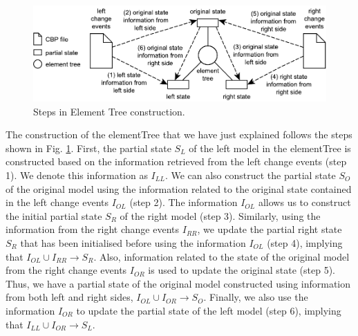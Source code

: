 \begin{figure}
    \centering
    \includegraphics[width=0.7\linewidth]{TreeConstruction}
    \caption{Steps in Element Tree construction.}
    \label{fig:tree_construction}
\end{figure} 

The construction of the \textsf{elementTree} that we have just explained follows the steps shown in Fig. \ref{fig:tree_construction}. First, the partial
state $S_{L}$ of the left model in the \textsf{elementTree} is constructed based on the information retrieved from the left change events (step 1). We denote this information as $I_{LL}$. We can also construct the partial 
state $S_{O}$ of the original model using the information related to the original state contained in the left change events $I_{OL}$ (step 2). The information $I_{OL}$ allows us to construct the initial partial 
state $S_{R}$ of the right model 
(step 3). Similarly, using the information from the right change events $I_{RR}$, we update the partial right state $S_{R}$ that has been initialised before using the information $I_{OL}$ (step 4), implying that $I_{OL} \cup I_{RR} \rightarrow S_{R}$. Also, information related to the state of the original model from the right change events $I_{OR}$ is used to update the original state  (step 5). Thus, we have a partial state of the original model constructed using information from both left and right sides, $I_{OL} \cup I_{OR} \rightarrow S_{O}$. Finally, we also use the information $I_{OR}$ to update 
the partial state of the left model (step 6), implying that $I_{LL} \cup I_{OR} \rightarrow S_{L}$.  



